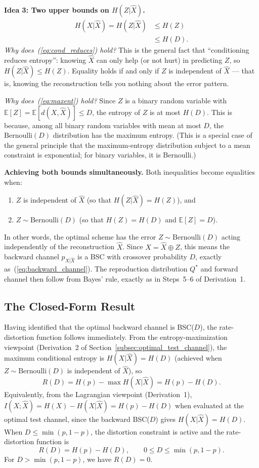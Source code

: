 \documentclass[11pt]{article}
\newcommand{\RD}{R(D)}
\newcommand{\Hp}{H(p)}
\newcommand{\HD}{H(D)}
\newcommand{\Ber}{\mathrm{Bernoulli}}
\newcommand{\E}{\mathbb{E}}
\begin{document}
\smallskip
\noindent\textbf{Idea 3: Two upper bounds on $H(Z|\hat{X})$.}
\begin{align}
H(X|\hat{X}) = H(Z|\hat{X})
&\leq H(Z) \label{eq:cond_reduces}\\
&\leq H(D). \label{eq:maxent}
\end{align}
\emph{Why does~(\ref{eq:cond_reduces}) hold?}
This is the general fact that ``conditioning reduces entropy'': knowing
$\hat{X}$ can only help (or not hurt) in predicting $Z$, so
$H(Z|\hat{X}) \leq H(Z)$.
Equality holds if and only if $Z$ is independent of $\hat{X}$ --- that is,
knowing the reconstruction tells you nothing about the error pattern.

\emph{Why does~(\ref{eq:maxent}) hold?}
Since $Z$ is a binary random variable with $\E[Z] = \E[d(X,\hat{X})] \leq D$,
the entropy of $Z$ is at most $H(D)$.
This is because, among all binary random variables with mean at most $D$,
the $\Ber(D)$ distribution has the maximum entropy.
(This is a special case of the general principle that the maximum-entropy
distribution subject to a mean constraint is exponential; for binary variables,
it is Bernoulli.)

\smallskip
\noindent\textbf{Achieving both bounds simultaneously.}
Both inequalities become equalities when:
\begin{enumerate}
    \item $Z$ is independent of $\hat{X}$ (so that $H(Z|\hat{X}) = H(Z)$), and
    \item $Z \sim \Ber(D)$ (so that $H(Z) = H(D)$ and $\E[Z] = D$).
\end{enumerate}
In other words, the optimal scheme has the error $Z \sim \Ber(D)$ acting
independently of the reconstruction $\hat{X}$.
Since $X = \hat{X} \oplus Z$, this means the backward channel
$p_{X|\hat{X}}$ is a BSC with crossover probability $D$, exactly
as~(\ref{eq:backward_channel}).
The reproduction distribution $Q^*$ and forward channel then follow from
Bayes' rule, exactly as in Steps~5--6 of Derivation~1.

\subsection{The Closed-Form Result}
\label{subsec:rd_closedform}

Having identified that the optimal backward channel is BSC($D$), the
rate-distortion function follows immediately.
From the entropy-maximization viewpoint (Derivation~2 of
Section~\ref{subsec:optimal_test_channel}), the maximum conditional entropy is
$H(X|\hat{X}) = H(D)$ (achieved when $Z \sim \Ber(D)$ is independent of
$\hat{X}$), so
\[
\RD = H(p) - \max H(X|\hat{X}) = H(p) - H(D).
\]
Equivalently, from the Lagrangian viewpoint (Derivation~1), $I(X;\hat{X})
= H(X) - H(X|\hat{X}) = H(p) - H(D)$ when evaluated at the optimal test
channel, since the backward BSC($D$) gives $H(X|\hat{X}) = H(D)$.
When $D \leq \min(p, 1-p)$, the distortion constraint is active and the
rate-distortion function is
\begin{equation}
\label{eq:rd_bernoulli}
\boxed{\RD = \Hp - \HD, \qquad 0 \leq D \leq \min(p, 1-p).}
\end{equation}
For $D > \min(p, 1-p)$, we have $\RD = 0$.
\end{document}
